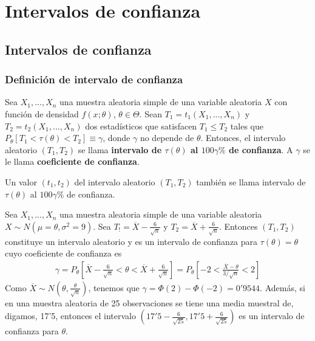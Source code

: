 \chapter{Intervalos de confianza}

\section{Intervalos de confianza}

\subsection{Definición de intervalo de confianza}

\begin{defi}
    Sea $X_1,...,X_n$ una muestra aleatoria simple de una variable aleatoria $X$ con función de densidad $f(x;\theta)$, $\theta \in \Theta$. Sean $T_1 = t_1(X_1,...,X_n)$ y $T_2 = t_2(X_1,...,X_n)$ dos estadísticos que satisfacen $T_1 \leq T_2$ tales que $P_{\theta}[T_1 < \tau(\theta) < T_2] \equiv \gamma$, donde $\gamma$ no depende de $\theta$. Entonces, el intervalo aleatorio $(T_1,T_2)$ se llama \textbf{intervalo  de $\tau(\theta)$ al $100\gamma\% $ de confianza}. A $\gamma$ se le llama \textbf{coeficiente de confianza}.

    Un valor $(t_1,t_2)$ del intervalo aleatorio $(T_1,T_2)$ también se llama intervalo  de $\tau(\theta)$ al $100\gamma\% $ de confianza.
\end{defi}


\begin{ejemplo}
    Sea $X_1,...,X_n$ una muestra aleatoria simple de una variable aleatoria $X \sim N(\mu = \theta,\sigma^2 =9)$. Sea $T_! = \overline{X} - \frac{6}{\sqrt{n}}$ y $T_2 = \overline{X} + \frac{6}{\sqrt{n}}$. Entonces $(T_1,T_2)$ constituye un intervalo aleatorio y es un intervalo de confianza para $\tau(\theta) = \theta$ cuyo coeficiente de confianza es
    \begin{align*}
        \gamma = P_{\theta}\left[\overline{X} - \frac{6}{\sqrt{n}} < \theta < \overline{X} + \frac{6}{\sqrt{n}}\right] = P_{\theta}\left[ -2 < \frac{\overline{X} - \theta}{3/\sqrt{n}} < 2\right]
    \end{align*}
    Como $\overline{X} \sim N\left(\theta, \frac{\theta}{\sqrt{n}} \right)$, tenemos que $\gamma =\Phi(2) - \Phi(-2) = 0'9544$. Además, si en una muestra aleatoria de 25 observaciones se tiene una media muestral de, digamos, 17'5, entonces el intervalo $\left(17'5 - \frac{6}{\sqrt{25}}, 17'5 + \frac{6}{\sqrt{25}} \right)$ es un intervalo de confianza para $\theta$.
\end{ejemplo}

